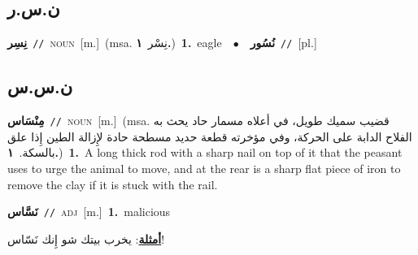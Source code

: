 \documentclass[10pt,a4paper,twoside]{article} %
\begin{document}
\begin{multicols}{2}
\vspace{-3mm}
\subsection*{\color{blue}\foreignlanguage{arabic}{ن.س.ر}\color{blue}{}} 

{\setlength\topsep{0pt}\textbf{\foreignlanguage{arabic}{نِسِر}}\ {\color{gray}\texttt{//}\color{black}}\ \textsc{noun}\ [m.]\ \color{gray}(msa. \foreignlanguage{arabic}{نِسْر}~\foreignlanguage{arabic}{\textbf{١.}})\color{black}\ \textbf{1.}~eagle\ \ $\bullet$\ \ \setlength\topsep{0pt}\textbf{\foreignlanguage{arabic}{نُسُور}}\ {\color{gray}\texttt{//}\color{black}}\ [pl.]\ } \vspace{2mm}

\vspace{-3mm}
\subsection*{\color{blue}\foreignlanguage{arabic}{ن.س.س}\color{blue}{}} 

{\setlength\topsep{0pt}\textbf{\foreignlanguage{arabic}{مِنْسَاس}}\ {\color{gray}\texttt{//}\color{black}}\ \textsc{noun}\ [m.]\ \color{gray}(msa. \foreignlanguage{arabic}{قضيب سميك طويل، في أعلاه مسمار حاد يحث به الفلاح الدابة على الحركة، وفي مؤخرته قطعة حديد مسطحة حادة لإِزالة الطين إِذا علق بالسكة.}~\foreignlanguage{arabic}{\textbf{١.}})\color{black}\ \textbf{1.}~A long thick rod with a sharp nail on top of it that the peasant uses to urge the animal to move, and at the rear is a sharp flat piece of iron to remove the clay if it is stuck with the rail.\ } \vspace{2mm}

{\setlength\topsep{0pt}\textbf{\foreignlanguage{arabic}{نَسَّاس}}\ {\color{gray}\texttt{//}\color{black}}\ \textsc{adj}\ [m.]\ \textbf{1.}~malicious\  \begin{flushright}\color{gray}\foreignlanguage{arabic}{\textbf{\underline{\foreignlanguage{arabic}{أمثلة}}}: يخرب بيتك شو إِنك نَسّاس!}\end{flushright}\color{black}} \vspace{2mm}


\end{multicols}
\end{document}
